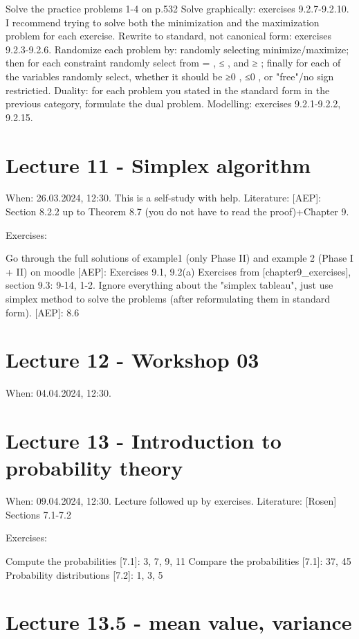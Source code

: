 \documentclass{article}
\begin{document}
{{{{{{{{{{{{Solve the practice problems 1-4 on p.532
Solve graphically: exercises 9.2.7-9.2.10. I recommend trying to solve both the minimization and the maximization problem for each exercise.
Rewrite to standard, not canonical form: exercises 9.2.3-9.2.6. Randomize each problem by: randomly selecting minimize/maximize; then for each constraint randomly select from =
, ≤
, and ≥
; finally for each of the variables randomly select, whether it should be ≥0
, ≤0
, or "free"/no sign restrictied.
Duality: for each problem you stated in the standard form in the previous category, formulate the dual problem.
Modelling: exercises 9.2.1-9.2.2, 9.2.15.

\section*{Lecture 11 - Simplex algorithm}

When: 26.03.2024, 12:30. This is a self-study with help.
Literature: [AEP]: Section 8.2.2 up to Theorem 8.7 (you do not have to read the proof)+Chapter 9.

Exercises:

Go through the full solutions of example1 (only Phase II) and example 2 (Phase I + II) on moodle
[AEP]: Exercises 9.1, 9.2(a)
Exercises from [chapter9_exercises], section 9.3: 9-14, 1-2.  Ignore everything about the "simplex tableau", just use simplex method to solve the problems (after reformulating them in standard form).
[AEP]: 8.6

\section*{Lecture 12 - Workshop 03}

When: 04.04.2024, 12:30.

\section*{Lecture 13 - Introduction to probability theory}

When: 09.04.2024, 12:30. Lecture followed up by exercises.
Literature: [Rosen] Sections 7.1-7.2

Exercises:

Compute the probabilities [7.1]: 3, 7, 9, 11
Compare the probabilities [7.1]: 37, 45
Probability distributions [7.2]: 1, 3, 5

\section*{Lecture 13.5 - mean value, variance}

}}}}}}}}}}}}
\end{document}
